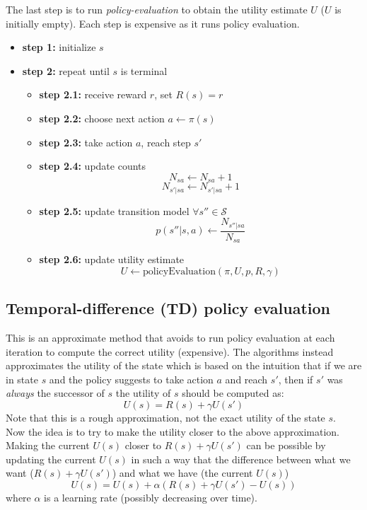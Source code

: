 The last step is to run \textit{policy-evaluation} to obtain the utility estimate $U$ ($U$ is initially empty). Each step is expensive as it runs policy evaluation. 

\begin{itemize}
    \item \textbf{step 1:} initialize $s$
    \item \textbf{step 2:} repeat until $s$ is terminal
    \begin{itemize}
    \item \textbf{step 2.1:} receive reward $r$, set $R(s) = r$
    \item \textbf{step 2.2:} choose next action $a \leftarrow \pi(s)$
    \item \textbf{step 2.3:} take action $a$, reach step $s'$
    \item \textbf{step 2.4:} update counts
    $$N_{sa} \leftarrow N_{sa} +1$$
    $$N_{s' | sa} \leftarrow N_{s' | sa} +1$$
    \item \textbf{step 2.5:} update transition model $\forall s'' \in \mathcal{S}$
    $$p(s'' | s,a) \leftarrow \frac{N_{s''|sa}}{N_{sa}}$$
    \item \textbf{step 2.6:} update utility estimate
    $$U \leftarrow \text{policyEvaluation}(\pi, U, p, R, \gamma)$$
    \end{itemize}
\end{itemize}

\subsection{Temporal-difference (TD) policy evaluation}
This is an approximate method that avoids to run policy evaluation at each iteration to compute the correct utility (expensive). The algorithms instead approximates the utility of the state which is based on the intuition that if we are in state $s$ and the policy suggests to take action $a$ and reach $s'$, then if $s'$ was \textit{always} the successor of $s$ the utility of $s$ should be computed as:
\begin{equation}
    U(s) = R(s) + \gamma U(s')
\end{equation}
Note that this is a rough approximation, not the exact utility of the state $s$.\\
Now the idea is to try to make the utility closer to the above approximation. Making the current $U(s)$ closer to $R(s)+ \gamma U(s')$ can be possible by updating the current $U(s)$ in such a way that the difference between what we want ($R(s)+ \gamma U(s')$) and what we have (the current $U(s)$)
\begin{equation}
    U(s) = U(s) + \alpha(R(s) + \gamma U(s') - U(s))
\end{equation}
where $\alpha$ is a learning rate (possibly decreasing over time). \newline

